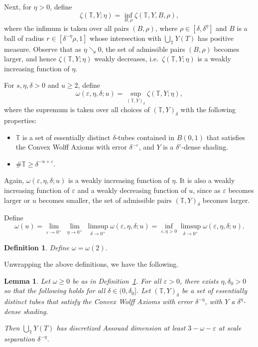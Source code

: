 \documentclass[letterpaper, reqno,11pt]{article}
\numberwithin{equation}{section}
\newcommand{\eps}{\varepsilon}
\newcommand{\tubes}{\mathbb{T}}
\numberwithin{thm}{section}
\newtheorem{defn}[thm]{Definition}
\newtheorem{lem}[thm]{Lemma}
\theoremstyle{remark}
\begin{document}
\noindent Next, for $\eta>0$, define
\begin{equation}\label{defnTubesYEta}
\zeta( \tubes,Y; \eta)=\inf_{B,\rho} \zeta( \tubes,Y,B, \rho),
\end{equation}
where the infimum is taken over all pairs $(B,\rho)$, where $\rho\in[\delta, \delta^{\eta}]$ and $B$ is a ball of radius $r \in [\delta^{-\eta}\rho, 1]$ whose intersection with $\bigcup_\tubes Y(T)$ has positive measure. Observe that as $\eta\searrow 0$, the set of admissible pairs $(B,\rho)$ becomes larger, and hence $\zeta( \tubes,Y; \eta)$ weakly decreases, i.e.~$\zeta( \tubes,Y; \eta)$ is a weakly increasing function of $\eta$. 

For $s,\eta,\delta>0$ and $u\geq 2$, define
\begin{equation}\label{defnOmegaSEtaDeltaU}
\omega(\eps,\eta,\delta;u)=\sup_{(\tubes,Y)_\delta} \zeta( \tubes,Y; \eta),
\end{equation}
where the supremum is taken over all choices of $(\tubes,Y)_\delta$ with the following properties:
\begin{itemize}
    \item $\tubes$ is a set of essentially distinct $\delta$-tubes contained in $B(0,1)$ that satisfies the Convex Wolff Axioms with error $\delta^{-\eps}$, and $Y$ is a $\delta^\eps$-dense shading.
    \item $\#\tubes \geq \delta^{-u+\eps}$.
\end{itemize}

Again, $\omega(\eps,\eta,\delta;u)$ is a weakly increasing function of $\eta$. It is also a weakly increasing function of $\eps$ and a weakly decreasing function of $u$, since as $\eps$  becomes larger or $u$ becomes smaller, the set of admissible pairs $(\tubes,Y)_\delta$ becomes larger. 


Define
\[
\omega(u) = \lim_{\eps\to0^+}\ \lim_{\eta\to 0^+}\ \limsup_{\delta\to 0^+}\omega(\eps,\eta,\delta;u)= \inf_{\eps,\eta>0}\limsup_{\delta\to 0^+}\omega(\eps,\eta,\delta;u).
\]

\begin{defn}\label{defnOmega}
Define $\omega = \omega(2)$.
\end{defn}
Unwrapping the above definitions, we have the following.

\begin{lem}\label{roleOfOmega}
Let $\omega\geq 0$ be as in Definition~\ref{defnOmega}. For all $\eps>0$, there exists $\eta,\delta_0>0$ so that the following holds for all $\delta\in (0,\delta_0]$. Let $(\tubes,Y)_{\delta}$ be a set of essentially distinct tubes that satisfy the Convex Wolff Axioms with error $\delta^{-\eta}$, with $Y$ a $\delta^{\eta}$-dense shading.

Then $\bigcup_{\tubes}Y(T)$ has discretized Assouad dimension at least $3-\omega-\eps$ at scale separation $\delta^{-\eta}$.
\end{lem}
\end{document}
